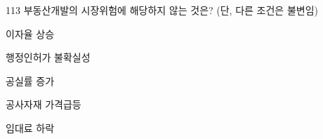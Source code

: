\begin{question}{113}
부동산개발의 시장위험에 해당하지 않는 것은? (단, 다른 조건은 불변임)
\begin{choices}
  \item 이자율 상승
  \item 행정인허가 불확실성
  \item 공실률 증가
  \item 공사자재 가격급등
  \item 임대료 하락
\end{choices}
\end{question}
